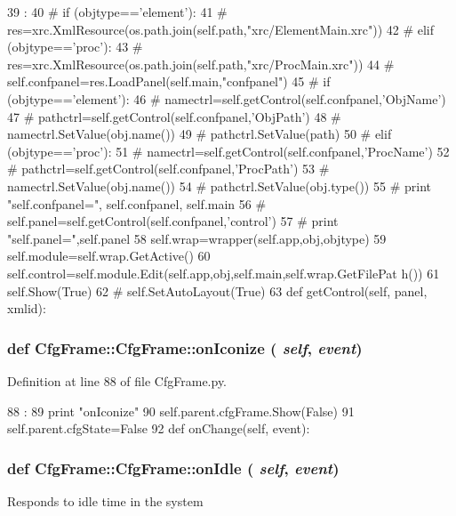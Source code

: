 \begin{DoxyCode}
39                                         :
40          # if (objtype=='element'):
41         #     res=xrc.XmlResource(os.path.join(self.path,"xrc/ElementMain.xrc"))
42         # elif (objtype=='proc'):
43         #     res=xrc.XmlResource(os.path.join(self.path,"xrc/ProcMain.xrc"))
44         # self.confpanel=res.LoadPanel(self.main,"confpanel")
45         # if (objtype=='element'):
46         #     namectrl=self.getControl(self.confpanel,'ObjName')
47         #     pathctrl=self.getControl(self.confpanel,'ObjPath')
48         #     namectrl.SetValue(obj.name())
49         #     pathctrl.SetValue(path)
50         # elif (objtype=='proc'):
51         #     namectrl=self.getControl(self.confpanel,'ProcName')
52         #     pathctrl=self.getControl(self.confpanel,'ProcPath')
53         #     namectrl.SetValue(obj.name())
54         #     pathctrl.SetValue(obj.type())
55         # print "self.confpanel=", self.confpanel, self.main
56         # self.panel=self.getControl(self.confpanel,'control')
57         # print "self.panel=",self.panel
58         self.wrap=wrapper(self.app,obj,objtype)
59         self.module=self.wrap.GetActive()
60         self.control=self.module.Edit(self.app,obj,self.main,self.wrap.GetFilePat
      h())
61         self.Show(True)
62 #        self.SetAutoLayout(True)
63                 
    def getControl(self, panel, xmlid):
\end{DoxyCode}
\hypertarget{classCfgFrame_1_1CfgFrame_ab437de758da4163a93d63b20ed9eb446}{
\subsubsection[{onIconize}]{\setlength{\rightskip}{0pt plus 5cm}def CfgFrame::CfgFrame::onIconize ( {\em self}, \/   {\em event})}}
\label{classCfgFrame_1_1CfgFrame_ab437de758da4163a93d63b20ed9eb446}


Definition at line 88 of file CfgFrame.py.


\begin{DoxyCode}
88                               :
89         print "onIconize"
90         self.parent.cfgFrame.Show(False)
91         self.parent.cfgState=False
92 
    def onChange(self, event):
\end{DoxyCode}
\hypertarget{classCfgFrame_1_1CfgFrame_a07409ab0756ec5f1cc5a5f12b6ef6af0}{
\subsubsection[{onIdle}]{\setlength{\rightskip}{0pt plus 5cm}def CfgFrame::CfgFrame::onIdle ( {\em self}, \/   {\em event})}}
\label{classCfgFrame_1_1CfgFrame_a07409ab0756ec5f1cc5a5f12b6ef6af0}
\begin{DoxyVerb}Responds to idle time in the system\end{DoxyVerb}
 

